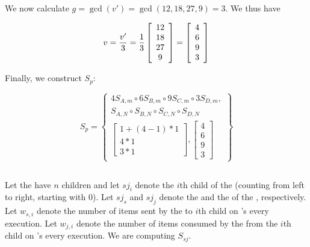 We now calculate $g = \gcd(v') = \gcd(12,18,27,9) = 3$.  We thus
have

\begin{displaymath}
v = {v' \over 3} = {1 \over 3} \left[
\begin{array}{c}
12\\ 18\\ 27\\ 9
\end{array}
\right] = \left[
\begin{array}{c}
4\\ 6\\ 9\\ 3
\end{array}
\right]
\end{displaymath}

Finally, we construct $S_p$:

\begin{displaymath}
S_p = \left\{
\begin{array}{c}
4 S_{A,m} \circ 6 S_{B,m} \circ 9 S_{C,m} \circ 3
S_{D,m}, \\ S_{A,N} \circ S_{B,N} \circ S_{C,N} \circ S_{D,N} \\
\left[
\begin{array}{c}
1 + (4-1) * 1 \\
4 * 1 \\
3 * 1
\end{array}\right],
\left[ \begin{array}{c} 4\\ 6\\ 9\\ 3 \end{array} \right]
\end{array}
\right\}
\end{displaymath}

\subsection{\splitjoin}

Let the {\splitjoin} have $n$ children and let $sj_i$ denote the
$i$th child of the {\splitjoin} (counting from left to right,
starting with 0).  Let $sj_s$ and $sj_j$ denote the {\splitter}
and the {\joiner} of the {\splitjoin}, respectively. Let $w_{s,i}$
denote the number of items sent by the {\splitter} to $i$th child
on {\splitter}'s every execution. Let $w_{j,i}$ denote the number
of items consumed by the {\joiner} from the $i$th child on
{\joiner}'s every execution.  We are computing $S_{sj}$.

